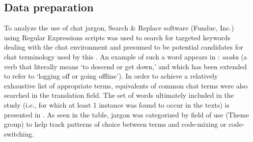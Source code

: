 \documentclass[output=paper
,newtxmath
,modfonts
,nonflat]{langsci/langscibook}
\begin{document}
\subsection{Data preparation}

To analyze the use of chat jargon, Search \& Replace software (Funduc, Inc.) using Regular Expressions scripts was used to search for targeted keywords dealing with the chat environment and presumed to be potential candidates for chat terminology used by this . An example of such a word appears in : \textit{sauka} (a  verb that literally means ‘to descend or get down,’ and which has been extended to refer to ‘logging off or going offline’). In order to achieve a relatively exhaustive list of appropriate terms,  equivalents of common chat terms were also searched in the translation field. The set of words ultimately included in the study (i.e., for which at least 1 instance was found to occur in the texts) is presented in . As seen in the table, jargon was categorized by field of use (Theme group) to help track patterns of choice between  terms and  code-mixing or code-switching. 
\end{document}
